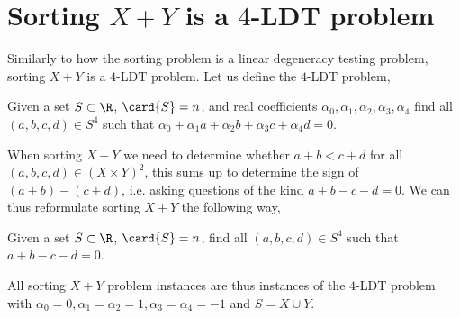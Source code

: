 \section{Sorting $X+Y$ is a $4$-LDT problem}

Similarly to how the sorting problem is a linear degeneracy testing problem,
sorting $X+Y$ is a $4$-LDT problem. Let us define the $4$-LDT problem,

\begin{problem}
Given a set $S \subset \R$, $\card{S} = n$, and real coefficients $\alpha_0,
\alpha_1, \alpha_2, \alpha_3, \alpha_4$ find all $(a,b,c,d) \in S^4$ such that
$\alpha_0 + \alpha_1 a + \alpha_2 b + \alpha_3 c + \alpha_4 d = 0$.
\end{problem}

When sorting $X+Y$ we need to determine whether $a + b < c + d$ for all
$(a,b,c,d) \in (X \times Y)^2$, this sums up to determine the sign of $(a+b) -
(c+d)$, i.e. asking questions of the kind $a + b - c - d = 0$. We can thus
reformulate sorting $X+Y$ the following way,

\begin{problem}
Given a set $S \subset \R$, $\card{S} = n$, find all $(a,b,c,d) \in S^4$ such
that $a + b - c - d = 0$.
\end{problem}

All sorting $X+Y$ problem instances are thus instances of the $4$-LDT problem
with $\alpha_0 = 0, \alpha_1 = \alpha_2 = 1, \alpha_3 = \alpha_4 = -1$ and
$S = X \cup Y$.

